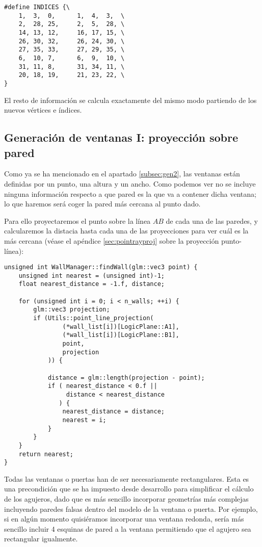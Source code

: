 \begin{lstlisting}
#define INDICES {\
    1,  3,  0,      1,  4,  3,  \
    2,  28, 25,     2,  5,  28, \
    14, 13, 12,     16, 17, 15, \
    26, 30, 32,     26, 24, 30, \
    27, 35, 33,     27, 29, 35, \
    6,  10, 7,      6,  9,  10, \
    31, 11, 8,      31, 34, 11, \
    20, 18, 19,     21, 23, 22, \
}
\end{lstlisting}

El resto de información se calcula exactamente del mismo modo partiendo de los nuevos vértices e índices.

\clearpage
\subsection{Generación de ventanas I: proyección sobre pared}
\label{sec:wallgenwindowsi}
Como ya se ha mencionado en el apartado \ref{subsec:gen2}, las ventanas están definidas por un punto, una altura y un ancho. Como podemos ver no se incluye ninguna información respecto a que pared es la que va a contener dicha ventana; lo que haremos será coger la pared más cercana al punto dado.

Para ello proyectaremos el punto sobre la línea $AB$ de cada una de las paredes, y calcularemos la distacia hasta cada una de las proyecciones para ver cuál es la más cercana (véase el apéndice \ref{sec:pointrayproj} sobre la proyección punto-línea):

\begin{lstlisting}
unsigned int WallManager::findWall(glm::vec3 point) {
	unsigned int nearest = (unsigned int)-1;
	float nearest_distance = -1.f, distance;
	
	for (unsigned int i = 0; i < n_walls; ++i) {
		glm::vec3 projection;
		if (Utils::point_line_projection(
		        (*wall_list[i])[LogicPlane::A1], 
		        (*wall_list[i])[LogicPlane::B1], 
		        point, 
		        projection
		    )) {
			
			distance = glm::length(projection - point);
			if ( nearest_distance < 0.f || 
			     distance < nearest_distance
			   ) {
				nearest_distance = distance;
				nearest = i;
			}
		}
	}
	return nearest;
}
\end{lstlisting}

Todas las ventanas o puertas han de ser necesariamente rectangulares. Esta es una precondición que se ha impuesto desde desarrollo para simplificar el cálculo de los agujeros, dado que es más sencillo incorporar geometrías más complejas incluyendo paredes falsas dentro del modelo de la ventana o puerta. Por ejemplo, si en algún momento quisiéramos incorporar una ventana redonda, sería más sencillo incluir 4 esquinas de pared a la ventana permitiendo que el agujero sea rectangular igualmente.

